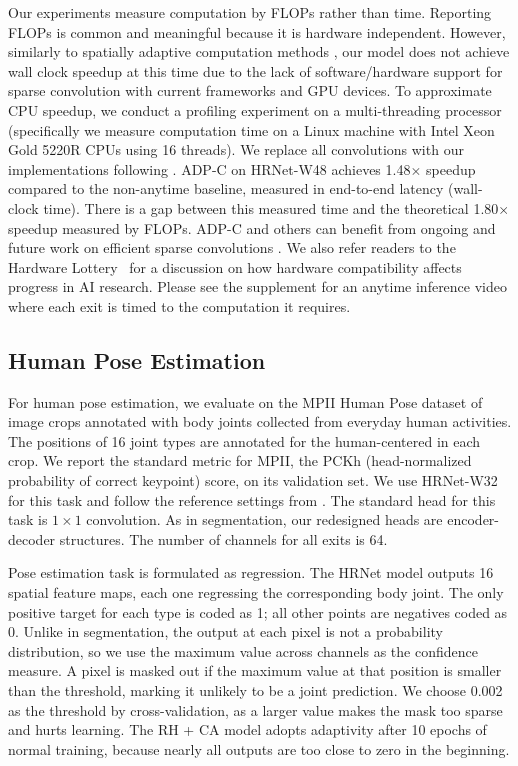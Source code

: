 \documentclass{article} %
\renewcommand{\cite}{\citep}
\begin{document}
Our experiments measure computation by FLOPs rather than time.
Reporting FLOPs is common \cite{figurnov2017spatially,xie2020spatially,huang2017multi,wang2018skipnet,liu2019rethinking} and meaningful because it is hardware independent.
However, similarly to spatially adaptive computation methods \cite{figurnov2017spatially,xie2020spatially}, our model does not achieve wall clock speedup at this time due to the lack of software/hardware support for sparse convolution with current frameworks and GPU devices.
To approximate CPU speedup, we conduct a profiling experiment on a multi-threading processor (specifically we measure computation time on a Linux machine with Intel Xeon Gold 5220R CPUs using 16 threads).
We replace all convolutions with our implementations following \cite{xie2020spatially}.
ADP-C on HRNet-W48 achieves 1.48$\times$ speedup compared to the non-anytime baseline, measured in end-to-end latency (wall-clock time).
There is a gap between this measured time and the theoretical 1.80$\times$ speedup measured by FLOPs. 
ADP-C and others can benefit from ongoing and future work on efficient sparse convolutions \cite{sparse1, sparse2,verelst2020dynamic,elsen2020fast}. We also refer readers to the Hardware Lottery~\cite{hooker2021hardware} for a discussion on how hardware compatibility affects progress in AI research. Please see the supplement for an anytime inference video where each exit is timed to the computation it requires.


\subsection{Human Pose Estimation}
For human pose estimation, we evaluate on the MPII Human Pose dataset \cite{andriluka14mpii} of
image crops annotated with body joints collected from everyday human activities.
The positions of 16 joint types are annotated for the human-centered in each crop.
We report the standard metric \cite{andriluka14mpii} for MPII, the PCKh (head-normalized probability of correct keypoint) score, on its validation set. 
We use HRNet-W32  for this task and follow the reference settings from \cite{sun2019deep}.
The standard head for this task is $1\times1$ convolution.
As in segmentation, our redesigned heads are encoder-decoder structures. 
The number of channels for all exits is 64. 

Pose estimation task is formulated as regression.
The HRNet model outputs 16 spatial feature maps, each one regressing the corresponding body joint. 
The only positive target for each type is coded as 1; all other points are negatives coded as 0.
Unlike in segmentation, the output at each pixel is not a probability distribution, so we use the maximum value across channels as the confidence measure.
A pixel is masked out if the maximum value at that position is smaller than the threshold, marking it unlikely to be a joint prediction.
We choose 0.002 as the threshold by cross-validation, as a larger value makes the mask too sparse and hurts learning. 
The RH + CA model adopts adaptivity after 10 epochs of normal training, because nearly all outputs are too close to zero in the beginning.
 
\end{document}
